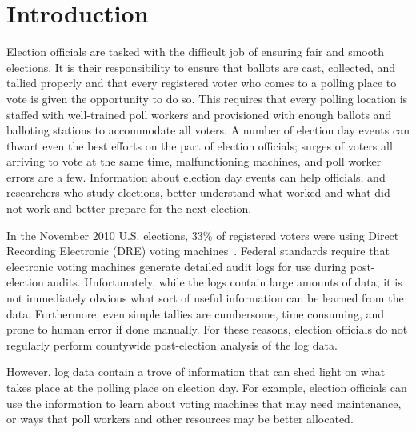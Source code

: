 \documentclass[letterpaper,twocolumn,10pt]{article}
\begin{document}
\section{Introduction}
Election officials are tasked with the difficult job of ensuring fair
  and smooth elections. It is their responsibility to ensure that ballots are
  cast, collected, and tallied properly and that every registered voter who
  comes to a polling place to vote is given the opportunity to do so. This
  requires that every polling location is staffed with well-trained poll workers
  and provisioned with enough ballots and balloting stations to accommodate all
  voters.  A number of election day events can thwart 
  even the best efforts on the part of election officials; surges of voters all
  arriving to vote at the same time, malfunctioning machines, and poll worker
  errors are a few. Information about election day events can help officials,
  and researchers who study elections, better understand
  what worked and what did not work and better prepare for the next election.


In the November 2010 U.S. elections, 33\% of registered voters were using Direct
Recording Electronic (DRE) voting machines~\cite{verifiedvoting-votingsystems}.
Federal standards require that electronic voting machines generate detailed
audit logs for use during post-election audits. Unfortunately, while the logs
contain large amounts of data, it is not immediately obvious what sort of useful
information can be learned from the data. Furthermore, even simple
tallies are cumbersome, time consuming, and prone to human error if done
manually. For these reasons, election officials do not regularly perform
countywide post-election analysis of the log data.

However, log data contain a trove of information that can shed light
on what takes place at the polling place on election day. For example,
election officials can use the information to learn about voting machines that
may need maintenance, or ways that poll workers and other resources may be
better allocated.
\end{document}
